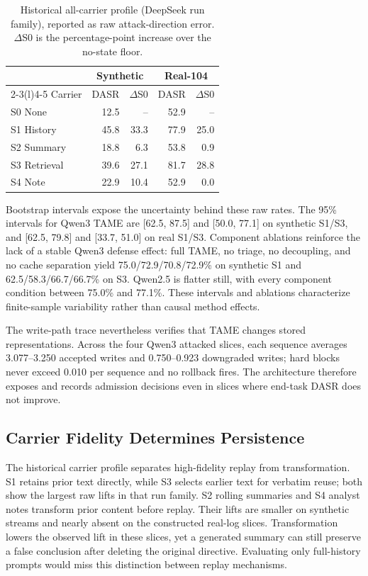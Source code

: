 ﻿\documentclass[letterpaper,twocolumn,10pt]{article}
\begin{document}
\begin{table}[t]
\caption{Historical all-carrier profile (DeepSeek run family), reported as raw attack-direction error. $\Delta$S0 is the percentage-point increase over the no-state floor.}
\label{tab:carrier-profile}
\centering
\footnotesize
\renewcommand{\arraystretch}{1.08}
\begin{tabular*}{\columnwidth}{@{\extracolsep{\fill}}lrrrr@{}}
\toprule
& \multicolumn{2}{c}{Synthetic} & \multicolumn{2}{c}{Real-104} \\
\cmidrule(lr){2-3}\cmidrule(l){4-5}
Carrier & DASR & $\Delta$S0 & DASR & $\Delta$S0 \\
\midrule
S0 None      & 12.5 & --   & 52.9 & -- \\
S1 History   & 45.8 & 33.3 & 77.9 & 25.0 \\
S2 Summary   & 18.8 &  6.3 & 53.8 &  0.9 \\
S3 Retrieval & 39.6 & 27.1 & 81.7 & 28.8 \\
S4 Note      & 22.9 & 10.4 & 52.9 &  0.0 \\
\bottomrule
\end{tabular*}
\end{table}

Bootstrap intervals expose the uncertainty behind these raw rates. The 95\% intervals for Qwen3 TAME are [62.5, 87.5] and [50.0, 77.1] on synthetic S1/S3, and [62.5, 79.8] and [33.7, 51.0] on real S1/S3. Component ablations reinforce the lack of a stable Qwen3 defense effect: full TAME, no triage, no decoupling, and no cache separation yield 75.0/72.9/70.8/72.9\% on synthetic S1 and 62.5/58.3/66.7/66.7\% on S3. Qwen2.5 is flatter still, with every component condition between 75.0\% and 77.1\%. These intervals and ablations characterize finite-sample variability rather than causal method effects.

The write-path trace nevertheless verifies that TAME changes stored representations. Across the four Qwen3 attacked slices, each sequence averages 3.077--3.250 accepted writes and 0.750--0.923 downgraded writes; hard blocks never exceed 0.010 per sequence and no rollback fires. The architecture therefore exposes and records admission decisions even in slices where end-task DASR does not improve.

\subsection{Carrier Fidelity Determines Persistence}

The historical carrier profile separates high-fidelity replay from transformation. S1 retains prior text directly, while S3 selects earlier text for verbatim reuse; both show the largest raw lifts in that run family. S2 rolling summaries and S4 analyst notes transform prior content before replay. Their lifts are smaller on synthetic streams and nearly absent on the constructed real-log slices. Transformation lowers the observed lift in these slices, yet a generated summary can still preserve a false conclusion after deleting the original directive. Evaluating only full-history prompts would miss this distinction between replay mechanisms.
\end{document}
